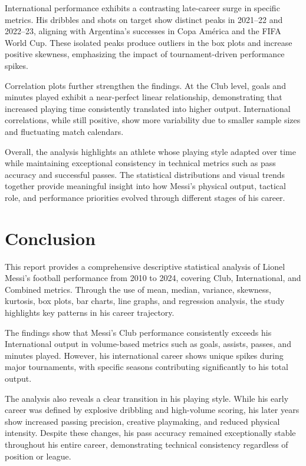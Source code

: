 \documentclass[12pt,a4paper]{report}
\begin{document}
International performance exhibits a contrasting late-career surge in specific metrics. 
His dribbles and shots on target show distinct peaks in 2021–22 and 2022–23, aligning 
with Argentina's successes in Copa América and the FIFA World Cup. These isolated 
peaks produce outliers in the box plots and increase positive skewness, emphasizing the 
impact of tournament-driven performance spikes.

Correlation plots further strengthen the findings. At the Club level, goals and 
minutes played exhibit a near-perfect linear relationship, demonstrating that increased 
playing time consistently translated into higher output. International correlations, 
while still positive, show more variability due to smaller sample sizes and fluctuating 
match calendars.

Overall, the analysis highlights an athlete whose playing style adapted over time while 
maintaining exceptional consistency in technical metrics such as pass accuracy and 
successful passes. The statistical distributions and visual trends together provide 
meaningful insight into how Messi’s physical output, tactical role, and performance 
priorities evolved through different stages of his career.

\chapter{Conclusion}

This report provides a comprehensive descriptive statistical analysis of Lionel Messi’s 
football performance from 2010 to 2024, covering Club, International, and Combined 
metrics. Through the use of mean, median, variance, skewness, kurtosis, box plots, 
bar charts, line graphs, and regression analysis, the study highlights key patterns in 
his career trajectory.

The findings show that Messi’s Club performance consistently exceeds his International 
output in volume-based metrics such as goals, assists, passes, and minutes played. 
However, his international career shows unique spikes during major tournaments, with 
specific seasons contributing significantly to his total output.

The analysis also reveals a clear transition in his playing style. While his early 
career was defined by explosive dribbling and high-volume scoring, his later years 
show increased passing precision, creative playmaking, and reduced physical intensity. 
Despite these changes, his pass accuracy remained exceptionally stable throughout his 
entire career, demonstrating technical consistency regardless of position or league.
\end{document}
